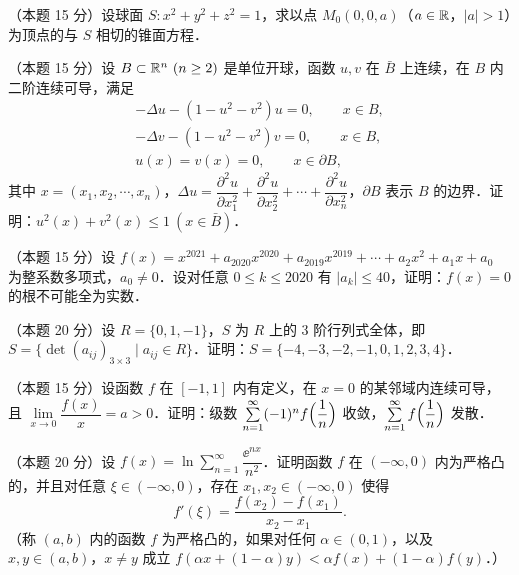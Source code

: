 
\begin{problems}

\item[一、]（本题 15 分）设球面 $S: x^2+y^2+z^2=1$，求以点 $M_0(0,0,a)$（$a\in\mathbb{R}$，$|a|>1$）为顶点的与 $S$ 相切的锥面方程．

\item[二、]（本题 15 分）设 $B\subset\R^n\ (n\ge2)$ 是单位开球，函数 $u,v$ 在 $\bar B$ 上连续，在 $B$ 内二阶连续可导，满足
\[
\begin{gathered}
  -\Delta u-(1-u^2-v^2)u=0,\qquad x\in B,\\
  -\Delta v-(1-u^2-v^2)v=0,\qquad x\in B,\\
  u(x)=v(x)=0,\qquad x\in\partial B,
\end{gathered}
\]
其中 $x=(x_1,x_2,\cdots,x_n)$，$\Delta u=\dfrac{\partial^2u}{\partial x_1^2}+\dfrac{\partial^2u}{\partial x_2^2}+\cdots+\dfrac{\partial^2u}{\partial x_n^2}$，$\partial B$ 表示 $B$ 的边界．证明：$u^2(x)+v^2(x)\le1\ (x\in\bar B)$．

\item[三、]（本题 15 分）设 $f(x)=x^{2021}+a_{2020}x^{2020}+a_{2019}x^{2019}+\cdots+a_2x^2+a_1x+a_0$ 为整系数多项式，$a_0\ne0$．设对任意 $0\le k\le2020$ 有 $|a_k|\le40$，证明：$f(x)=0$ 的根不可能全为实数．

\item[四、]（本题 20 分）设 $R=\{0,1,-1\}$，$S$ 为 $R$ 上的 3 阶行列式全体，即 $S=\{\det(a_{ij})_{3\times3}\mid a_{ij}\in R\}$．证明：$S=\{-4,-3,-2,-1,0,1,2,3,4\}$．

\item[五、]（本题 15 分）设函数 $f$ 在 $[-1,1]$ 内有定义，在 $x=0$ 的某邻域内连续可导，且 $\lim\limits_{x\to0}\dfrac{f(x)}{x}=a>0$．证明：级数 $\sum\limits_{n=1}^{\infty}(-1)^nf\Bigl(\dfrac{1}{n}\Bigr)$ 收敛，$\sum\limits_{n=1}^{\infty}f\Bigl(\dfrac{1}{n}\Bigr)$ 发散．

\item[六、]（本题 20 分）设 $f(x)=\ln\sum\limits_{n=1}^{\infty}\dfrac{\ee^{nx}}{n^2}$．证明函数 $f$ 在 $(-\infty,0)$ 内为严格凸的，并且对任意 $\xi\in(-\infty,0)$，存在 $x_1,x_2\in(-\infty,0)$ 使得
\[
  f'(\xi)=\frac{f(x_2)-f(x_1)}{x_2-x_1}.
\]
（称 $(a,b)$ 内的函数 $f$ 为严格凸的，如果对任何 $\alpha\in(0,1)$，以及 $x,y\in(a,b)$，$x\ne y$ 成立 $f(\alpha x+(1-\alpha)y)<\alpha f(x)+(1-\alpha)f(y)$．）

\end{problems}
